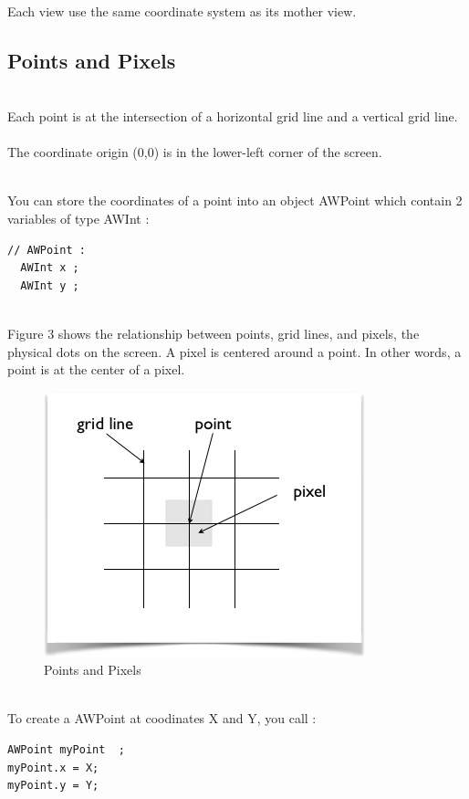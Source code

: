 \documentclass[a4paper,11pt]{extarticle}
\begin{document}
~\\ Each view use the same coordinate system as its mother view. 


\newpage
\subsection{Points and Pixels}

~\\Each point is at the intersection of a horizontal grid line and a vertical grid line. 
~\\The coordinate origin (0,0) is in the lower-left corner of the screen. 

~\\You can store the coordinates of a point into an object AWPoint which contain 2 variables of type AWInt :

\begin{lstlisting}[language=Arduinonl]
// AWPoint :
  AWInt x ;
  AWInt y ;
\end{lstlisting}

~\\Figure 3 shows the relationship between points, grid lines, and pixels, the physical dots on the screen. 
A pixel is centered around a point. In other words, a point is at the center of a pixel.

\begin{figure}[htbp]
   \centering
   \includegraphics[scale=0.8]{AWFig3.png} 
   \caption{Points and Pixels}
   \label{fig:3 }
\end{figure}


~\\To create a AWPoint at coodinates X and Y, you call :
\begin{lstlisting}[language=Arduinonl]
AWPoint myPoint  ;
myPoint.x = X;
myPoint.y = Y;
\end{lstlisting}
\end{document}
